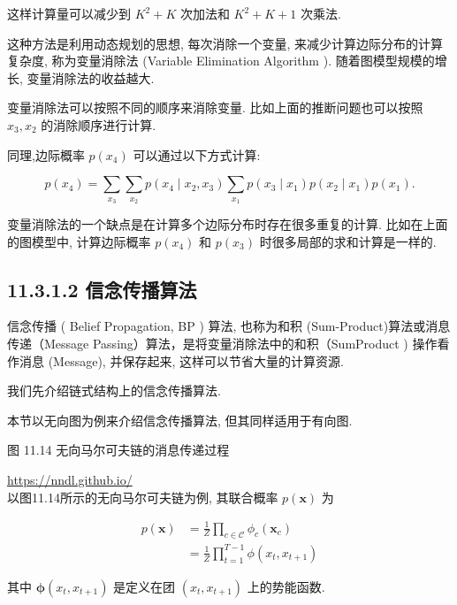 \documentclass[10pt]{article}
\begin{document}
这样计算量可以减少到 $K^{2}+K$ 次加法和 $K^{2}+K+1$ 次乘法.

这种方法是利用动态规划的思想, 每次消除一个变量, 来减少计算边际分布的计算复杂度, 称为变量消除法 (Variable Elimination Algorithm ). 随着图模型规模的增长, 变量消除法的收益越大.

变量消除法可以按照不同的顺序来消除变量. 比如上面的推断问题也可以按照 $x_{3}, x_{2}$ 的消除顺序进行计算.

同理,边际概率 $p\left(x_{4}\right)$ 可以通过以下方式计算:


\begin{equation*}
p\left(x_{4}\right)=\sum_{x_{3}} \sum_{x_{2}} p\left(x_{4} \mid x_{2}, x_{3}\right) \sum_{x_{1}} p\left(x_{3} \mid x_{1}\right) p\left(x_{2} \mid x_{1}\right) p\left(x_{1}\right) . \tag{11.72}
\end{equation*}


变量消除法的一个缺点是在计算多个边际分布时存在很多重复的计算. 比如在上面的图模型中, 计算边际概率 $p\left(x_{4}\right)$ 和 $p\left(x_{3}\right)$ 时很多局部的求和计算是一样的.

\subsection*{11.3.1.2 信念传播算法}
信念传播 ( Belief Propagation, BP ) 算法, 也称为和积 (Sum-Product)算法或消息传递（Message Passing）算法，是将变量消除法中的和积（SumProduct ) 操作看作消息 (Message), 并保存起来, 这样可以节省大量的计算资源.

我们先介绍链式结构上的信念传播算法.



本节以无向图为例来介绍信念传播算法, 但其同样适用于有向图.

图 11.14 无向马尔可夫链的消息传递过程

\href{https://nndl.github.io/}{https://nndl.github.io/}\\
以图11.14所示的无向马尔可夫链为例, 其联合概率 $p(\boldsymbol{x})$ 为


\begin{align*}
p(\boldsymbol{x}) & =\frac{1}{Z} \prod_{c \in \mathcal{C}} \phi_{c}\left(\boldsymbol{x}_{c}\right)  \tag{11.73}\\
& =\frac{1}{Z} \prod_{t=1}^{T-1} \phi\left(x_{t}, x_{t+1}\right) \tag{11.74}
\end{align*}


其中 $\boldsymbol{\phi}\left(x_{t}, x_{t+1}\right)$ 是定义在团 $\left(x_{t}, x_{t+1}\right)$ 上的势能函数.
\end{document}
